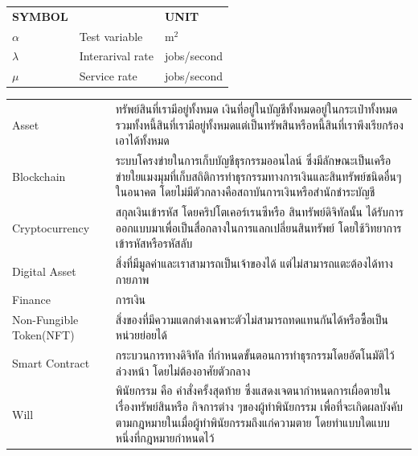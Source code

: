 \documentclass[12pt,oneside,openright,a4paper]{cpe-thai-project}
\begin{document}
\listofsymbols
\begin{flushleft}
\begin{tabular}{@{}p{}p{}p{}}
\textbf{SYMBOL}  & & \textbf{UNIT} \\[0.2cm]
$\alpha$ & Test variable\hfill & m$^2$ \\
$\lambda$ & Interarival rate\hfill &  jobs/second\\
$\mu$ & Service rate\hfill & jobs/second\\
\end{tabular}
\end{flushleft}
\listofvocab
\begin{flushleft}
\begin{tabular}{@{}p{1in}@{=\extracolsep{0.5in}}l}
Asset & ทรัพย์สินที่เรามีอยู่ทั้งหมด เงินที่อยู่ในบัญชีทั้งหมดอยู่ในกระเป๋าทั้งหมดรวมทั้งหนี้สินที่เรามีอยู่ทั้งหมดแต่เป็นทรัพสินหรือหนี้สินที่เราพึงเรียกร้องเอาได้ทั้งหมด \\
Blockchain & ระบบโครงข่ายในการเก็บบัญชีธุรกรรมออนไลน์ ซึ่งมีลักษณะเป็นเครือข่ายใยแมงมุมที่เก็บสถิติการทำธุรกรรมทางการเงินและสินทรัพย์ชนิดอื่นๆในอนาคต โดยไม่มีตัวกลางคือสถาบันการเงินหรือสำนักชำระบัญชี \\
Cryptocurrency & สกุลเงินเข้ารหัส โดยคริปโตเคอร์เรนซีหรือ สินทรัพย์ดิจิทัลนั้น ได้รับการออกแบบมาเพื่อเป็นสื่อกลางในการแลกเปลี่ยนสินทรัพย์ โดยใช้วิทยาการเข้ารหัสหรือรหัสลับ\\
Digital Asset & สิ่งที่มีมูลค่าและเราสามารถเป็นเจ้าของได้ แต่ไม่สามารถแตะต้องได้ทางกายภาพ\\
Finance & การเงิน\\
Non-Fungible Token(NFT) & สิ่งของที่มีความแตกต่างเฉพาะตัวไม่สามารถทดแทนกันได้หรือซื้อเป็นหน่วยย่อยได้\\
Smart Contract & กระบวนการทางดิจิทัล ที่กำหนดขั้นตอนการทำธุรกรรมโดยอัตโนมัติไว้ล่วงหน้า โดยไม่ต้องอาศัยตัวกลาง\\
Will  & พินัยกรรม คือ คำสั่งครั้งสุดท้าย ซึ่งแสดงเจตนากำหนดการเผื่อตายในเรื่องทรัพย์สินหรือ กิจการต่าง ๆของผู้ทำพินัยกรรม เพื่อที่จะเกิดผลบังคับตามกฎหมายในเมื่อผู้ทำพินัยกรรมถึงแก่ความตาย โดยทำแบบใดแบบหนึ่งที่กฎหมายกำหนดไว้\\
\end{tabular}
\end{flushleft}
\end{document}

